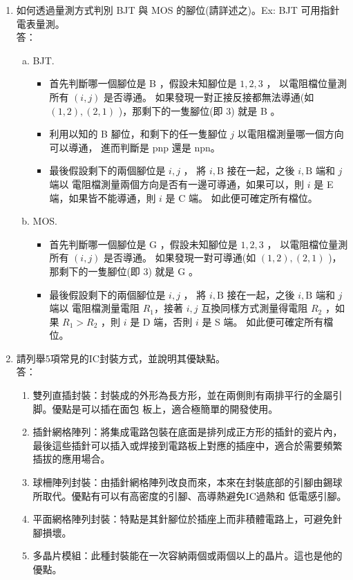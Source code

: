 \documentclass[12pt, a4paper]{article}
\begin{document}
\begin{enumerate}[itemsep=20pt, topsep=10pt]

  \item {如何透過量測方式判別 BJT 與 MOS 的腳位(請詳述之)。Ex: BJT 可用指針電表量測。} \\[10pt]
    答：
    \begin{enumerate}[(a)]
      \item BJT. 
        \begin{itemize}
          \item 首先判斷哪一個腳位是 B ，假設未知腳位是 $1, 2, 3$ ， 以電阻檔位量測所有 $(i, j)$ 是否導通。
            如果發現一對正接反接都無法導通(如 $(1, 2), (2, 1)$ )，那剩下的一隻腳位(即 $3$) 就是 B 。
          \item 利用以知的 B 腳位，和剩下的任一隻腳位 $j$ 以電阻檔測量哪一個方向可以導通，
            進而判斷是 pnp 還是 npn。
          \item 最後假設剩下的兩個腳位是 $i, j$ ， 將 $i, \text{B}$ 接在一起，之後 $i, \text{B}$ 端和 $j$ 端以
            電阻檔測量兩個方向是否有一邊可導通，如果可以，則 $i$ 是 E 端，如果皆不能導通，則 $i$ 是 C 端。
            如此便可確定所有檔位。
        \end{itemize}
      \item MOS. 
        \begin{itemize}
          \item 首先判斷哪一個腳位是 G ，假設未知腳位是 $1, 2, 3$ ， 以電阻檔位量測所有 $(i, j)$ 是否導通。
            如果發現一對可導通(如 $(1, 2), (2, 1)$ )，那剩下的一隻腳位(即 $3$) 就是 G 。
          \item 最後假設剩下的兩個腳位是 $i, j$ ， 將 $i, \text{B}$ 接在一起，之後 $i, \text{B}$ 端和 $j$ 端以
            電阻檔測量電阻 $R_1$，接著 $i, j$ 互換同樣方式測量得電阻 $R_2$
            ，如果 $R_1 > R_2$ ，則 $i$ 是 D 端，否則 $i$ 是 S 端。
            如此便可確定所有檔位。
        \end{itemize}
    \end{enumerate}

  \item {請列舉5項常見的IC封裝方式，並說明其優缺點。} \\[10pt]
    答：
    \begin{enumerate}
      \item 雙列直插封裝：封裝成的外形為長方形，並在兩側則有兩排平行的金屬引脚。優點是可以插在面包
        板上，適合極簡單的開發使用。
      \item 插針網格陣列：將集成電路包裝在底面是排列成正方形的插針的瓷片內，最後這些插針可以插入或焊接到電路板上對應的插座中，適合於需要頻繁插拔的應用場合。
      \item 球柵陣列封裝：由插針網格陣列改良而來，本來在封裝底部的引腳由錫球所取代。優點有可以有高密度的引腳、高導熱避免IC過熱和
        低電感引腳。
      \item 平面網格陣列封裝：特點是其針腳位於插座上而非積體電路上，可避免針腳損壞。
      \item 多晶片模組：此種封裝能在一次容納兩個或兩個以上的晶片。這也是他的優點。
    \end{enumerate}


\end{enumerate}
\end{document}
